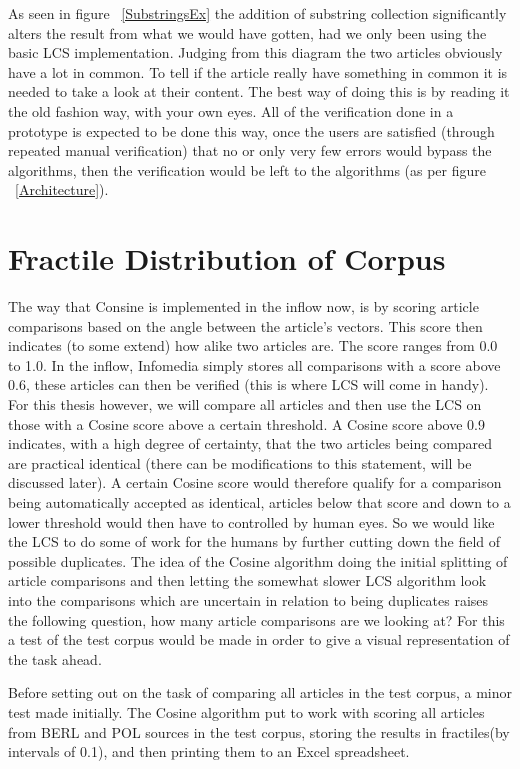As seen in figure ~\ref{SubstringsEx} the addition of substring collection significantly alters the result from what we would have gotten, had we only been using the basic LCS implementation. Judging from this diagram the two articles obviously have a lot in common. To tell if the article really have something in common it is needed to take a look at their content. The best way of doing this is by reading it the old fashion way, with your own eyes.  All of the verification done in a prototype is expected to be done this way, once the users are satisfied (through repeated manual verification) that no or only very few errors would bypass the algorithms, then the verification would be left to the algorithms (as per figure ~\ref{Architecture}).

\section{Fractile Distribution of Corpus}
The way that Consine is implemented in the inflow now, is by scoring article comparisons based on the angle between the article's vectors. This score then indicates (to some extend) how alike two articles are. The score ranges from 0.0 to 1.0. In the inflow, Infomedia simply stores all comparisons with a score above 0.6, these articles can then be verified (this is where LCS will come in handy). For this thesis however, we will compare all articles and then use the LCS on those with a Cosine score above a certain threshold. A Cosine score above 0.9 indicates, with a high degree of certainty, that the two articles being compared are practical identical (there can be modifications to this statement, will be discussed later). A certain Cosine score would therefore qualify for a comparison being automatically accepted as identical, articles below that score and down to a lower threshold would then have to controlled by human eyes. So we would like the LCS to do some of work for the humans by further cutting down the field of possible duplicates. The idea of the Cosine algorithm doing the initial splitting of article comparisons and then letting the somewhat slower LCS algorithm look into the comparisons which are uncertain in relation to being duplicates raises the following question, how many article comparisons are we looking at? For this a test of the test corpus would be made in order to give a visual representation of the task ahead.

Before setting out on the task of comparing all articles in the test corpus, a minor test made initially. The Cosine algorithm put to work with scoring all articles from BERL and POL sources in the test corpus, storing the results in fractiles(by intervals of 0.1), and then printing them to an Excel spreadsheet.


